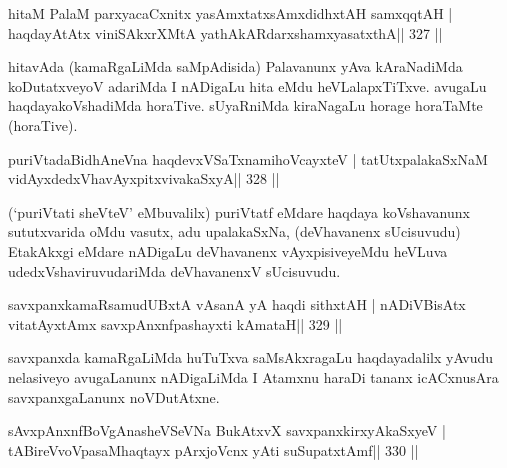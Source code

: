 
\begin{shl}
hitaM PalaM parxyacaCxnitx yasAmxtatxsAmxdidhxtAH samxqqtAH |
haqdayAtAtx viniSAkxrXMtA yathA\s kARdarxshamxyasatxthA\hfill || 327 ||
\end{shl}

\begin{artha}
hitavAda (kamaRgaLiMda saMpAdisida) Palavanunx yAva kAraNadiMda 
koDutatxveyoV adariMda I nADigaLu hita eMdu heVLalapxTiTxve. avugaLu 
haqdayakoVshadiMda horaTive. sUyaRniMda kiraNagaLu horage horaTaMte 
(horaTive). 
\end{artha}


\begin{shl}
puriVtadaBidhAneVna haqdevxVSaTxnamihoVcayxteV |
tatUtxpalakaSxNaM vidAyxdedxVhavAyxpitxvivakaSxyA\hfill || 328 ||
\end{shl}

\begin{artha}
(`puriVtati sheVteV' eMbuvalilx) puriVtatf eMdare haqdaya koVshavanunx 
sututxvarida oMdu vasutx, adu upalakaSxNa, (deVhavanenx sUcisuvudu) EtakAkxgi eMdare nADigaLu deVhavanenx vAyxpisiveyeMdu heVLuva udedxVshaviruvudariMda deVhavanenxV sUcisuvudu.
\end{artha}

\begin{shl}
savxpanxkamaRsamudUBxtA vAsanA yA haqdi sithxtAH |
nADiVBisAtx vitatAyx\s\s tAmx savxpAnxnfpashayxti  kAmataH\hfill || 329 ||
\end{shl}

\begin{artha}
savxpanxda kamaRgaLiMda huTuTxva saMsAkxragaLu haqdayadalilx yAvudu nelasiveyo avugaLanunx nADigaLiMda I Atamxnu haraDi tananx icACxnusAra savxpanxgaLanunx noVDutAtxne.
\end{artha}

\begin{shl}
sAvxpAnxnfBoVgAnasheVSeVNa BukAtxvX savxpanxkirxyAkaSxyeV |
\footnotemark[6]tABireVvoVpasaMhaqtayx pArxjoVcnx yAti suSupatxtAmf\hfill || 330 ||
\end{shl}

